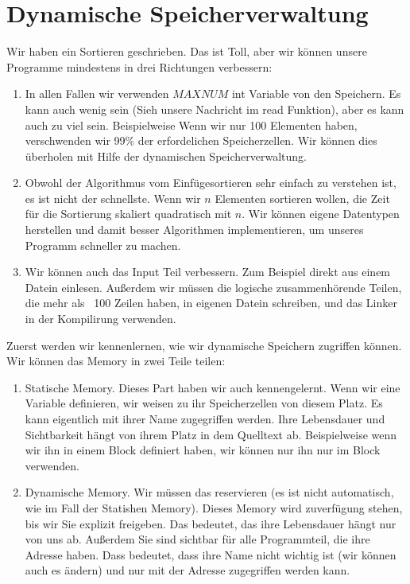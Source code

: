 \section{Dynamische Speicherverwaltung}
Wir haben ein Sortieren geschrieben. Das ist Toll, aber wir können unsere Programme mindestens in drei Richtungen
verbessern:
\begin{enumerate}
\item In allen Fallen wir verwenden $MAXNUM$ int Variable von den Speichern. Es kann auch wenig sein (Sieh unsere
Nachricht im read Funktion), aber es kann auch zu viel sein. Beispielweise Wenn wir nur 100 Elementen haben, verschwenden
wir 99\% der erfordelichen Speicherzellen. Wir können dies überholen mit Hilfe der dynamischen Speicherverwaltung.
\item
Obwohl der Algorithmus vom Einfügesortieren sehr einfach zu verstehen ist, es ist nicht der schnellste. Wenn wir 
$n$ Elementen sortieren wollen, die Zeit für die Sortierung skaliert quadratisch mit $n$. Wir können 
eigene Datentypen herstellen und damit besser Algorithmen implementieren, um unseres Programm schneller zu machen.
\item
Wir können auch das Input Teil verbessern. Zum Beispiel direkt aus einem Datein einlesen. Außerdem wir müssen
die logische zusammenhörende Teilen, die mehr als ~100 Zeilen haben, in eigenen Datein schreiben, und das Linker
in der Kompilirung verwenden.
\end{enumerate}
Zuerst werden wir kennenlernen, wie wir dynamische Speichern zugriffen können. Wir können das Memory in zwei Teile teilen:
\begin{enumerate}
\item Statische Memory. Dieses Part haben wir auch kennengelernt. Wenn wir eine Variable definieren, wir weisen zu ihr
Speicherzellen von diesem Platz. Es kann eigentlich mit ihrer Name zugegriffen werden. Ihre Lebensdauer und Sichtbarkeit 
hängt von ihrem Platz in dem Quelltext ab. Beispielweise wenn wir ihn in einem Block definiert haben, wir können
nur ihn nur im Block verwenden.
\item Dynamische Memory. Wir müssen das reservieren (es ist nicht automatisch, wie im Fall der Statishen Memory).
Dieses Memory wird zuverfügung stehen, bis wir Sie explizit freigeben. Das bedeutet, das ihre Lebensdauer 
hängt nur von uns ab. Außerdem  Sie sind sichtbar für alle Programmteil, die ihre Adresse haben. Dass
bedeutet, dass ihre Name nicht wichtig ist (wir können auch es ändern) und nur mit der Adresse zugegriffen 
werden kann.
\end{enumerate}

